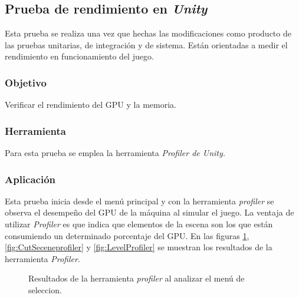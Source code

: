 \subsection{Prueba de rendimiento en \textit{Unity}}
Esta prueba se realiza una vez que hechas las modificaciones como producto de
las pruebas unitarias, de integración y de sistema. Están orientadas a medir
el rendimiento en funcionamiento del juego.

\subsubsection{Objetivo}
Verificar el rendimiento del GPU y la memoria.

\subsubsection{Herramienta}
Para esta prueba se emplea la herramienta \textit{Profiler de Unity.}

\subsubsection{Aplicación}
Esta prueba inicia desde el menú principal y con la herramienta \textit{profiler} se
observa el desempeño del GPU de la máquina al simular el juego. La ventaja de utilizar
\textit{Profiler} es que indica que elementos de la escena son los que están
consumiendo un determinado porcentaje del GPU. En las figuras
\ref{fig:MenuSelectionprofiler}, \ref{fig:CutSeceneprofiler} y
\ref{fig:LevelProfiler} se muestran los resultados de la
herramienta \textit{Profiler}.
\begin{figure}
  \centering
 
   
        
  \caption{Resultados de la herramienta \textit{profiler} al analizar el menú de        
  seleccion.}
  \label{fig:MenuSelectionprofiler}
\end{figure}

